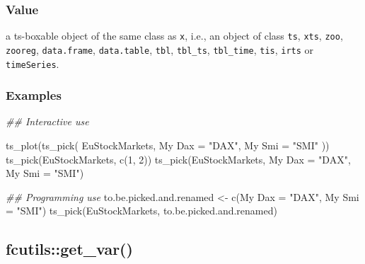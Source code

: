 \documentclass[
  letterpaper,
  DIV=11,
  numbers=noendperiod]{scrreport}
\newenvironment{Shaded}{\begin{snugshade}}{\end{snugshade}}
\newcommand{\AttributeTok}[1]{\textcolor[rgb]{0.40,0.45,0.13}{#1}}
\newcommand{\DecValTok}[1]{\textcolor[rgb]{0.68,0.00,0.00}{#1}}
\newcommand{\DocumentationTok}[1]{\textcolor[rgb]{0.37,0.37,0.37}{\textit{#1}}}
\newcommand{\FunctionTok}[1]{\textcolor[rgb]{0.28,0.35,0.67}{#1}}
\newcommand{\NormalTok}[1]{\textcolor[rgb]{0.00,0.23,0.31}{#1}}
\newcommand{\OtherTok}[1]{\textcolor[rgb]{0.00,0.23,0.31}{#1}}
\newcommand{\StringTok}[1]{\textcolor[rgb]{0.13,0.47,0.30}{#1}}
\begin{document}
\subsubsection{Value}\label{value-57}

a ts-boxable object of the same class as \texttt{x}, i.e., an object of
class \texttt{ts}, \texttt{xts}, \texttt{zoo}, \texttt{zooreg},
\texttt{data.frame}, \texttt{data.table}, \texttt{tbl},
\texttt{tbl\_ts}, \texttt{tbl\_time}, \texttt{tis}, \texttt{irts} or
\texttt{timeSeries}.

\subsubsection{Examples}\label{examples-57}

\begin{Shaded}
\begin{Highlighting}[]
\DocumentationTok{\#\# Interactive use}

\FunctionTok{ts\_plot}\NormalTok{(}\FunctionTok{ts\_pick}\NormalTok{(}
\NormalTok{  EuStockMarkets,}
  \StringTok{\textasciigrave{}}\AttributeTok{My Dax}\StringTok{\textasciigrave{}} \OtherTok{=} \StringTok{"DAX"}\NormalTok{,}
  \StringTok{\textasciigrave{}}\AttributeTok{My Smi}\StringTok{\textasciigrave{}} \OtherTok{=} \StringTok{"SMI"}
\NormalTok{))}
\FunctionTok{ts\_pick}\NormalTok{(EuStockMarkets, }\FunctionTok{c}\NormalTok{(}\DecValTok{1}\NormalTok{, }\DecValTok{2}\NormalTok{))}
\FunctionTok{ts\_pick}\NormalTok{(EuStockMarkets, }\StringTok{\textasciigrave{}}\AttributeTok{My Dax}\StringTok{\textasciigrave{}} \OtherTok{=} \StringTok{"DAX"}\NormalTok{, }\StringTok{\textasciigrave{}}\AttributeTok{My Smi}\StringTok{\textasciigrave{}} \OtherTok{=} \StringTok{"SMI"}\NormalTok{)}

\DocumentationTok{\#\# Programming use}
\NormalTok{to.be.picked.and.renamed }\OtherTok{\textless{}{-}} \FunctionTok{c}\NormalTok{(}\StringTok{\textasciigrave{}}\AttributeTok{My Dax}\StringTok{\textasciigrave{}} \OtherTok{=} \StringTok{"DAX"}\NormalTok{, }\StringTok{\textasciigrave{}}\AttributeTok{My Smi}\StringTok{\textasciigrave{}} \OtherTok{=} \StringTok{"SMI"}\NormalTok{)}
\FunctionTok{ts\_pick}\NormalTok{(EuStockMarkets, to.be.picked.and.renamed)}
\end{Highlighting}
\end{Shaded}

\subsection{fcutils::get\_var()}\label{fcutilsget_var}
\end{document}
